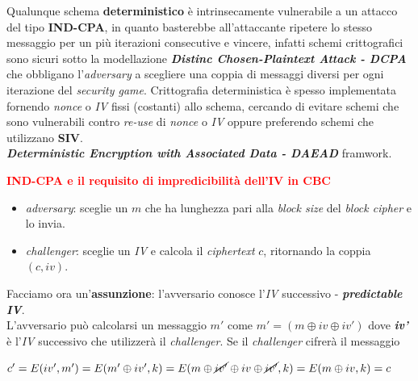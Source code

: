 \begin{flushleft}
    Qualunque schema \textbf{deterministico} è intrinsecamente vulnerabile a un attacco del tipo \textbf{IND-CPA}, in quanto basterebbe all'attaccante ripetere lo stesso messaggio per un più iterazioni consecutive e vincere, infatti schemi crittografici sono sicuri sotto la modellazione \textbf{\textit{Distinc Chosen-Plaintext Attack - DCPA}} che obbligano l'\textit{adversary} a scegliere una coppia di messaggi diversi per ogni iterazione del \textit{security game}. Crittografia deterministica è spesso implementata fornendo \textit{nonce} o \textit{IV} fissi (costanti) allo schema, cercando di evitare schemi che sono vulnerabili contro \textit{re-use} di \textit{nonce} o \textit{IV} oppure preferendo schemi che utilizzano \textbf{SIV}. \\
    \textbf{\textit{Deterministic Encryption with Associated Data - DAEAD}} framwork.
\end{flushleft}

\begin{boxA}
    \textcolor{red}{\textbf{IND-CPA e il requisito di impredicibilità dell'IV in CBC}}
    \begin{itemize}[nosep]
        \item \textit{adversary}: sceglie un $m$ che ha lunghezza pari alla \textit{block size} del \textit{block cipher} e lo invia.
        \item \textit{challenger}: sceglie un \textit{IV} e calcola il \textit{ciphertext} $c$, ritornando la coppia $(c, iv)$.
    \end{itemize}
    Facciamo ora un'\textbf{assunzione}: l'avversario conosce l'\textit{IV} successivo - \textbf{\textit{predictable IV}}. \\
    L'avversario può calcolarsi un messaggio $m'$ come $m' = (m \oplus iv \oplus iv')$ dove \textbf{\textit{iv'}} è l'\textit{IV} successivo che utilizzerà il \textit{challenger}. Se il \textit{challenger} cifrerà il messaggio 
    
    {\centering
        $c' = E(iv', m') = E(m' \oplus iv', k) = E(m \oplus \cancel{iv'} \oplus iv \oplus \cancel{iv'}, k) = E(m \oplus iv, k) = c$
    \par}
\end{boxA}

